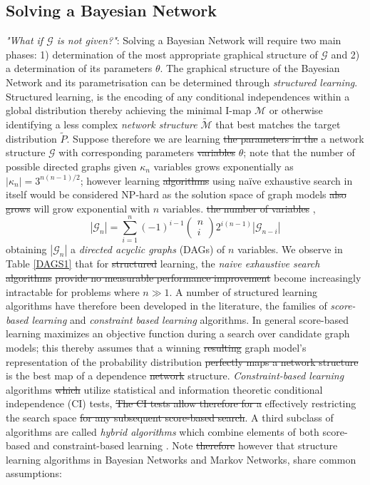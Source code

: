 \documentclass[7pt]{article}
\begin{document}
\subsection{Solving a Bayesian Network}
\emph{"What if $\mathcal{G}$ is not given?"}: Solving a Bayesian Network will require two main phases: 1) determination of the most appropriate graphical structure of $\mathcal{G}$ and 2) a determination of its parameters $\theta$. The graphical structure of the Bayesian Network and its parametrisation can be determined through \emph{structured learning}. Structured learning, is the encoding of any conditional independences within a global distribution thereby achieving the minimal I-map $\mathcal{M}$ or otherwise identifying a less complex \emph{network structure} $\tilde{\mathcal{M}}$ that best matches the target distribution ${\tilde{P}}$. Suppose therefore we are learning \st{the parameters in the} a network structure $\mathcal{G}$  with corresponding {parameters} \st{variables} $\theta$; note that the number of possible directed graphs given $\kappa_n$ variables grows exponentially as $|\kappa_n| = 3^{{n(n-1)}/{2}}$;
however learning \st{algorithms} using naïve exhaustive search in itself would be considered NP-hard {as}  the solution space of graph models \st{also grows} will grow exponential with $n$ variables.  \st{the number of variables} \cite{robinson1973counting},
\begin{equation}
|\mathcal{G}_n| = \sum_{i=1}^n (-1)^{i-1}  \begin{pmatrix}
n\\ 
i 
\end{pmatrix}
2^{i(n-1)} |\mathcal{G}_{n-i}|
\end{equation}
obtaining $|\mathcal{G}_n|$ a \emph{directed acyclic graphs} (DAGs) of $n$ variables. We observe  in Table \ref{DAGS1} that for \st{structured} learning, the \emph{naive exhaustive search} \st{algorithms} \st{provide no measurable performance improvement} become increasingly intractable for problems where $n\gg1$.   A number of structured learning algorithms have therefore been developed in the literature,  the families of \emph{score-based learning} and \emph{constraint based learning} algorithms. In general score-based learning maximizes an objective function during a search over candidate graph models; this  thereby assumes that a winning \st{resulting} graph model's representation of the probability distribution \st{perfectly maps a network structure} is the best map of a dependence \st{network} structure.  \emph{Constraint-based learning} algorithms \st{which} utilize statistical and information theoretic conditional independence (CI) tests, \st{The CI tests allow therefore for a} effectively restricting  {the} search space \st{for any subsequent score-based search}. A third subclass of algorithms are called \emph{hybrid algorithms} which combine elements of both score-based and constraint-based learning \cite{scutari2019learns, scanagatta2019survey}. Note \st{therefore} however that structure learning algorithms in Bayesian Networks and Markov Networks, share common assumptions:
\end{document}
